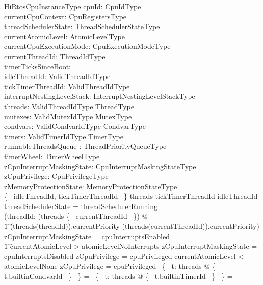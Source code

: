 \documentclass[11pt,letterpaper,twoside,openany]{book}
\begin{document}
\begin{schema}{HiRtosCpuInstanceType}
    cpuId: CpuIdType \\
    currentCpuContext: CpuRegistersType \\
    threadSchedulerState: ThreadSchedulerStateType \\
    currentAtomicLevel: AtomicLevelType \\
    currentCpuExecutionMode: CpuExecutionModeType \\
    currentThreadId: ThreadIdType \\
    timerTicksSinceBoot: \nat \\
    idleThreadId: ValidThreadIdType \\
    tickTimerThreadId: ValidThreadIdType \\
    interruptNestingLevelStack: InterruptNestingLevelStackType \\
    threads: ValidThreadIdType \finj ThreadType \\
    mutexes: ValidMutexIdType \finj MutexType \\
    condvars: ValidCondvarIdType \finj CondvarType \\
    timers: ValidTimerIdType \finj TimerType \\
    runnableThreadsQueue : ThreadPriorityQueueType \\
    timerWheel: TimerWheelType \\
    zCpuInterruptMaskingState: CpuInterruptMaskingStateType \\
    zCpuPrivilege: CpuPrivilegeType \\
    zMemoryProtectionState: MemoryProtectionStateType \\
\where
    \{~ idleThreadId, tickTimerThreadId ~\} \subseteq \dom threads
\also
    tickTimerThreadId \neq idleThreadId
\also
    threadSchedulerState = threadSchedulerRunning \implies \\
    (\forall threadId: (\dom threads \setminus \{~ currentThreadId ~\}) @ \\
\t1    (threads(threadId)).currentPriority \leq (threads(currentThreadId)).currentPriority)
\also
    zCpuInterruptMaskingState = cpuInterruptsEnabled \iff \\
\t1 currentAtomicLevel > atomicLevelNoInterrupts
\also
    zCpuInterruptMaskingState = cpuInterruptsDisabled \implies zCpuPrivilege = cpuPrivileged
\also
    currentAtomicLevel < atomicLevelNone \implies zCpuPrivilege = cpuPrivileged
\also
    \bigcap~\{~ t: \ran threads @ \{~ t.builtinCondvarId ~\} ~\} = \emptyset
\also
    \bigcap~\{~ t: \ran threads @ \{~ t.builtinTimerId ~\} ~\} = \emptyset

\end{schema}
\end{document}

